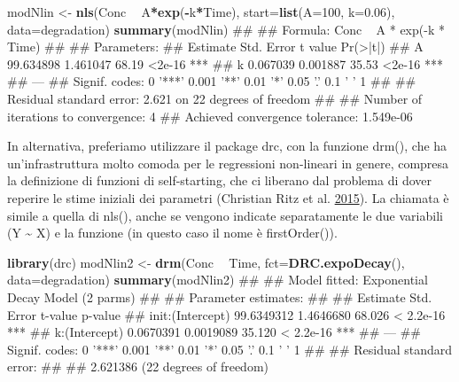 \documentclass[a4paper,12pt,oneside]{book}
\newenvironment{Shaded}{\begin{snugshade}}{\end{snugshade}}
\newcommand{\KeywordTok}[1]{\textcolor[rgb]{0.13,0.29,0.53}{\textbf{#1}}}
\newcommand{\DataTypeTok}[1]{\textcolor[rgb]{0.13,0.29,0.53}{#1}}
\newcommand{\DecValTok}[1]{\textcolor[rgb]{0.00,0.00,0.81}{#1}}
\newcommand{\FloatTok}[1]{\textcolor[rgb]{0.00,0.00,0.81}{#1}}
\newcommand{\StringTok}[1]{\textcolor[rgb]{0.31,0.60,0.02}{#1}}
\newcommand{\OperatorTok}[1]{\textcolor[rgb]{0.81,0.36,0.00}{\textbf{#1}}}
\newcommand{\NormalTok}[1]{#1}
\theoremstyle{definition}
\theoremstyle{definition}
\theoremstyle{definition}
\theoremstyle{remark}
\begin{document}
\begin{Shaded}
\begin{Highlighting}[]
\NormalTok{modNlin <-}\StringTok{ }\KeywordTok{nls}\NormalTok{(Conc }\OperatorTok{~}\StringTok{ }\NormalTok{A}\OperatorTok{*}\KeywordTok{exp}\NormalTok{(}\OperatorTok{-}\NormalTok{k}\OperatorTok{*}\NormalTok{Time), }
               \DataTypeTok{start=}\KeywordTok{list}\NormalTok{(}\DataTypeTok{A=}\DecValTok{100}\NormalTok{, }\DataTypeTok{k=}\FloatTok{0.06}\NormalTok{), }
               \DataTypeTok{data=}\NormalTok{degradation)}
\KeywordTok{summary}\NormalTok{(modNlin)}
\NormalTok{## }
\NormalTok{## Formula: Conc ~ A * exp(-k * Time)}
\NormalTok{## }
\NormalTok{## Parameters:}
\NormalTok{##    Estimate Std. Error t value Pr(>|t|)    }
\NormalTok{## A 99.634898   1.461047   68.19   <2e-16 ***}
\NormalTok{## k  0.067039   0.001887   35.53   <2e-16 ***}
\NormalTok{## ---}
\NormalTok{## Signif. codes:  0 '***' 0.001 '**' 0.01 '*' 0.05 '.' 0.1 ' ' 1}
\NormalTok{## }
\NormalTok{## Residual standard error: 2.621 on 22 degrees of freedom}
\NormalTok{## }
\NormalTok{## Number of iterations to convergence: 4 }
\NormalTok{## Achieved convergence tolerance: 1.549e-06}
\end{Highlighting}
\end{Shaded}

In alternativa, preferiamo utilizzare il package drc, con la funzione
drm(), che ha un'infrastruttura molto comoda per le regressioni
non-lineari in genere, compresa la definizione di funzioni di
self-starting, che ci liberano dal problema di dover reperire le stime
iniziali dei parametri (Christian Ritz et al.
\protect\hyperlink{ref-ritz2015_DoseResponseAnalysisUsing}{2015}). La
chiamata è simile a quella di nls(), anche se vengono indicate
separatamente le due variabili (Y \textasciitilde{} X) e la funzione (in
questo caso il nome è firstOrder()).

\begin{Shaded}
\begin{Highlighting}[]
\KeywordTok{library}\NormalTok{(drc)}
\NormalTok{modNlin2 <-}\StringTok{ }\KeywordTok{drm}\NormalTok{(Conc }\OperatorTok{~}\StringTok{ }\NormalTok{Time, }\DataTypeTok{fct=}\KeywordTok{DRC.expoDecay}\NormalTok{(),}
                \DataTypeTok{data=}\NormalTok{degradation)}
\KeywordTok{summary}\NormalTok{(modNlin2)}
\NormalTok{## }
\NormalTok{## Model fitted: Exponential Decay Model (2 parms)}
\NormalTok{## }
\NormalTok{## Parameter estimates:}
\NormalTok{## }
\NormalTok{##                    Estimate Std. Error t-value   p-value    }
\NormalTok{## init:(Intercept) 99.6349312  1.4646680  68.026 < 2.2e-16 ***}
\NormalTok{## k:(Intercept)     0.0670391  0.0019089  35.120 < 2.2e-16 ***}
\NormalTok{## ---}
\NormalTok{## Signif. codes:  0 '***' 0.001 '**' 0.01 '*' 0.05 '.' 0.1 ' ' 1}
\NormalTok{## }
\NormalTok{## Residual standard error:}
\NormalTok{## }
\NormalTok{##  2.621386 (22 degrees of freedom)}
\end{Highlighting}
\end{Shaded}
\end{document}
